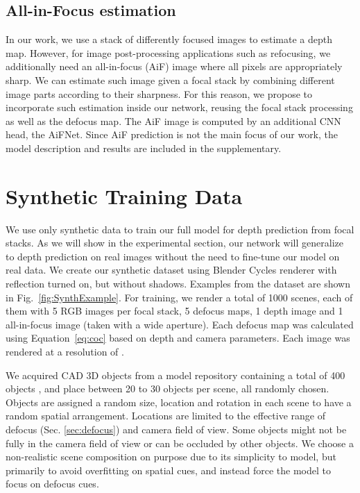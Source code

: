 \documentclass[10pt,twocolumn,letterpaper]{article}
\begin{document}
\subsection{All-in-Focus estimation} \label{sec:aif_est}


In our work, we use a stack of differently focused images to estimate a depth map. However, for image post-processing applications such as refocusing, we additionally need an all-in-focus (AiF) image where all pixels are appropriately sharp.
We can estimate such image given a focal stack by combining different image parts according to their sharpness. 
For this reason, we propose to incorporate such estimation inside our network, reusing the focal stack processing as well as the defocus map. The AiF image is computed by an additional CNN head, the AiFNet.
Since AiF prediction is not the main focus of our work, the model description and results are included in the supplementary.


\section{Synthetic Training Data} \label{sec:dataset}
We use only synthetic data to train our full model for depth prediction from focal stacks. As we will show in the experimental section, our network will generalize to depth prediction on real images without the need to fine-tune our model on real data.
We create our synthetic dataset using Blender \cite{blender2018} Cycles renderer with reflection turned on, but without shadows. Examples from the dataset are shown in Fig.~\ref{fig:SynthExample}.
For training, we render a total of 1000 scenes, each of them with 5 RGB images per focal stack, 5 defocus maps, 1 depth image and 1 all-in-focus image (taken with a wide aperture).
Each defocus map was calculated using Equation~\eqref{eq:coc} based on depth and camera parameters. Each image was rendered at a resolution of .


 We acquired CAD 3D objects from a model repository containing a total of 400 objects \cite{Thingi10K}, and place between 20 to 30 objects per scene, all randomly chosen. Objects are assigned a random size, location and rotation in each scene to have a random spatial arrangement. Locations are limited to the effective range of defocus (Sec. \ref{sec:defocus})  and camera field of view. 
Some objects might not be fully in the camera field of view or can be occluded by other objects.
We choose a non-realistic scene composition on purpose due to its simplicity to model, but primarily to avoid overfitting on spatial cues, and instead force the model to focus on defocus cues.
\end{document}
